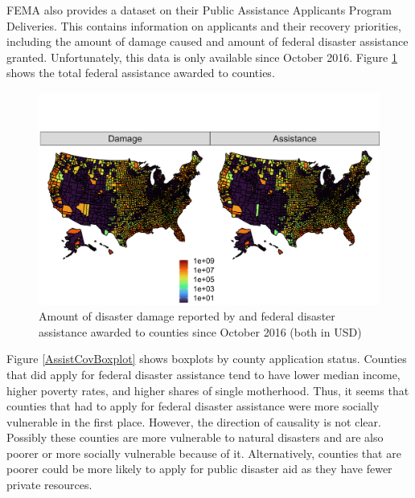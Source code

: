 


FEMA also provides a dataset on  their Public Assistance Applicants Program Deliveries. This contains information on applicants and their recovery priorities, including the amount of damage caused and amount of federal disaster assistance granted. Unfortunately, this data is only available since October 2016. Figure \ref{AssistanceMap} shows the total federal assistance awarded to counties.


\begin{figure}[!h]
	\centering
	\includegraphics[scale=1]{"../Code & Data/AssistanceMap.png"}
	\caption{Amount of disaster damage reported by and federal disaster assistance awarded to counties since October 2016 (both in USD)}
	\label{AssistanceMap}
\end{figure}


Figure \ref{AssistCovBoxplot} shows boxplots by county application status. Counties that did apply for federal disaster assistance tend to have lower median income, higher poverty rates, and higher shares of single motherhood. Thus, it seems that counties that had to apply for federal disaster assistance were more socially vulnerable in the first place. However, the direction of causality is not clear. Possibly these counties are more vulnerable to natural disasters and are also poorer or more socially vulnerable because of it. Alternatively, counties that are poorer could be more likely to apply for public disaster aid as they have fewer private resources.

